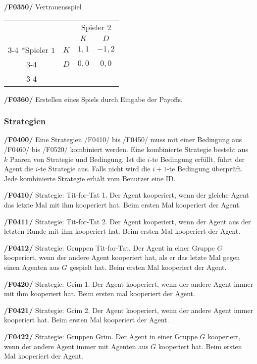 \textbf{/F0350/} 
Vertrauensspiel
\begin{table}[H]
\centering
\setlength{\extrarowheight}{2pt}
\begin{tabular}{cc|c|c|}
  & \multicolumn{1}{c}{} & \multicolumn{2}{c}{Spieler $2$} \\
  & \multicolumn{1}{c}{} & \multicolumn{1}{c}{$K$} & \multicolumn{1}{c}{$D$} \\\cline{3-4}
  \multirow{2}*{Spieler $1$} & $K$ & $1,1$ & $-1,2$ \\\cline{3-4} 
  & $D$ & $0,0$ & $0,0$ \\\cline{3-4}
\end{tabular}
\end{table}

\textbf{/F0360/} 
Erstellen eines Spiels durch Eingabe der Payoffs.

\subsubsection{Strategien}

\textbf{/F0400/}
Eine Strategien /F0410/ bis /F0450/ muss mit einer Bedingung aus /F0460/ bis /F0520/ kombiniert werden. Eine kombinierte Strategie besteht aus $k$ Paaren von Strategie und Bedingung. Ist die $i$-te Bedingung erfüllt, führt der Agent die $i$-te Strategie aus. Falls nicht wird die $i+1$-te Bedingung überprüft. Jede kombinierte Strategie erhält vom Benutzer eine ID.

\textbf{/F0410/} 
Strategie: Tit-for-Tat 1. Der Agent kooperiert, wenn der {\color{red}gleiche} Agent das letzte Mal mit ihm kooperiert hat. Beim ersten Mal kooperiert der Agent.

{\color{red}
\textbf{/F0411/}
Strategie: Tit-for-Tat 2. Der Agent kooperiert, wenn der Agent aus der letzten Runde mit ihm kooperiert hat. Beim ersten Mal kooperiert der Agent.

\textbf{/F0412/}
Strategie: Gruppen Tit-for-Tat. Der Agent in einer Gruppe $G$ kooperiert, wenn der andere Agent kooperiert hat, als er das letzte Mal gegen einen Agenten aus $G$ gespielt hat. Beim ersten Mal kooperiert der Agent.
}

\textbf{/F0420/} 
Strategie: Grim 1. Der Agent kooperiert, wenn der andere Agent immer mit ihm kooperiert hat. Beim ersten mal kooperiert der Agent.

{\color{red}
\textbf{/F0421/}
Strategie: Grim 2. Der Agent kooperiert, wenn der andere Agent immer kooperiert hat. Beim ersten Mal kooperiert der Agent.

\textbf{/F0422/}
Strategie: Gruppen Grim. Der Agent in einer Gruppe $G$ kooperiert, wenn der andere Agent immer mit Agenten aus $G$ kooperiert hat. Beim ersten Mal kooperiert der Agent.
}


